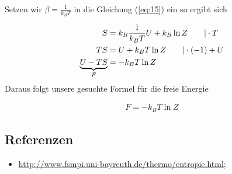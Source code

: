 Setzen wir \(\beta=\frac{1}{k_B T}\) in die Gleichung (\ref{eq:15}) ein so ergibt sich

\begin{align}
  \label{eq:16}
S &= k_B \frac{1}{k_B T} U + k_B \ln Z \qquad |\cdot T \notag \\
TS &=  U + k_B T \ln Z \qquad |\cdot (-1) +U \notag \\
\underbr{U - TS}_{F} &= - k_B T\ln Z 
\end{align}
Daraus folgt unsere gesuchte Formel für die freie Energie

\begin{align}
  \label{eq:17}
  \boxed{ F= - k_BT\ln Z }
\end{align}




\subsection*{Referenzen}


\begin{itemize}
\item \url{http://www.fsmpi.uni-bayreuth.de/thermo/entropie.html};
\end{itemize}


